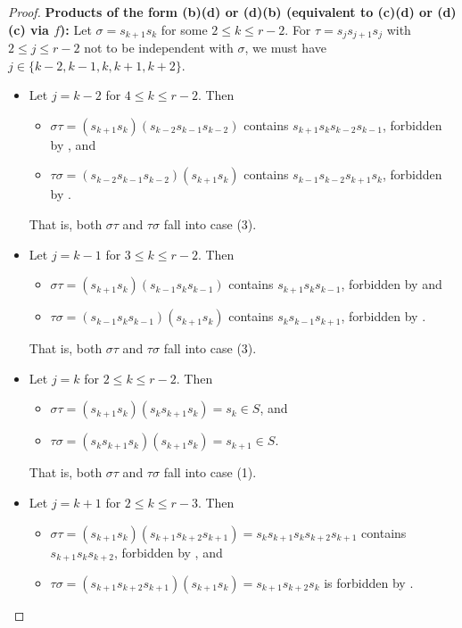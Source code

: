 \documentclass{amsart}
\theoremstyle{definition}
\begin{document}
\begin{appendices}
\begin{proof}
\noindent \textbf{Products of the form (b)(d) or (d)(b) (equivalent to (c)(d) or (d)(c) via $f$):}
    Let $\sigma=s_{k+1}s_k$ for some $2\leq k\leq r-2$. For $\tau=s_js_{j+1}s_j$ with $2\leq j\leq r-2$ not to be independent with $\sigma$, we must have $j\in\{k-2,k-1,k,k+1,k+2\}$.
    \begin{itemize}
        \item Let $j=k-2$ for $4\leq k\leq r-2$. Then \begin{itemize}
            \item $\sigma\tau=(s_{k+1}s_k)(s_{k-2}s_{k-1}s_{k-2})$ contains $s_{k+1}s_ks_{k-2}s_{k-1}$, forbidden by , and
            \item $\tau\sigma=(s_{k-2}s_{k-1}s_{k-2})(s_{k+1}s_k)$ contains $s_{k-1}s_{k-2}s_{k+1}s_k$, forbidden by .
        \end{itemize}
        That is, both $\sigma\tau$ and $\tau\sigma$ fall into case (3).
        \item Let $j=k-1$ for $3\leq k\leq r-2$. Then \begin{itemize}
            \item $\sigma\tau=(s_{k+1}s_k)(s_{k-1}s_ks_{k-1})$ contains $s_{k+1}s_ks_{k-1}$, forbidden by  and
            \item $\tau\sigma=(s_{k-1}s_ks_{k-1})(s_{k+1}s_k)$ contains $s_ks_{k-1}s_{k+1}$, forbidden by .
        \end{itemize}
        That is, both $\sigma\tau$ and $\tau\sigma$ fall into case (3).
        \item Let $j=k$ for $2\leq k\leq r-2$. Then \begin{itemize}
            \item $\sigma\tau=(s_{k+1}s_k)(s_{k}s_{k+1}s_k)=s_k\in S$, and
            \item $\tau\sigma=(s_{k}s_{k+1}s_k)(s_{k+1}s_k)=s_{k+1}\in S$.
        \end{itemize}
        That is, both $\sigma\tau$ and $\tau\sigma$ fall into case (1).
        \item Let $j=k+1$ for $2\leq k\leq r-3$. Then \begin{itemize}
            \item $\sigma\tau=(s_{k+1}s_k)(s_{k+1}s_{k+2}s_{k+1}) = s_ks_{k+1}s_ks_{k+2}s_{k+1}$ contains $s_{k+1}s_ks_{k+2}$, forbidden by \newline {}, and
            \item $\tau\sigma=(s_{k+1}s_{k+2}s_{k+1})(s_{k+1}s_k) = s_{k+1}s_{k+2}s_k$ is forbidden by .

\end{itemize}
\end{itemize}
\end{proof}
\end{appendices}
\end{document}
